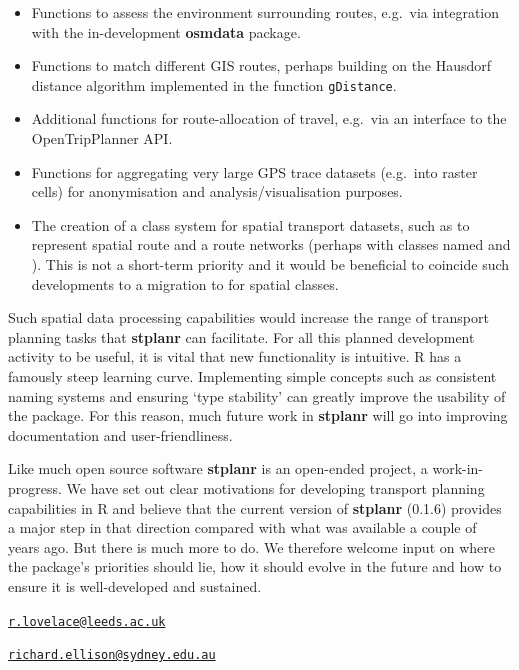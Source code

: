 \begin{itemize}
\tightlist
\item
  Functions to assess the environment surrounding routes, e.g.~via
  integration with the in-development \textbf{osmdata} package.
\item
  Functions to match different GIS routes, perhaps building on the
  Hausdorf distance algorithm implemented in the 
  function \texttt{gDistance}.
\item
  Additional functions for route-allocation of travel, e.g.~via an
  interface to the OpenTripPlanner API.
\item
  Functions for aggregating very large GPS trace datasets (e.g.~into
  raster cells) for anonymisation and analysis/visualisation purposes.
\item
  The creation of a class system for spatial transport datasets, such as
  to represent spatial route and a route networks (perhaps with classes
  named  and ). This is not a short-term priority
  and it would be beneficial to coincide such developments to a
  migration to  for spatial classes.
\end{itemize}

Such spatial data processing capabilities would increase the range of
transport planning tasks that \textbf{stplanr} can facilitate. For all
this planned development activity to be useful, it is vital that new
functionality is intuitive. R has a famously steep learning curve.
Implementing simple concepts such as consistent naming systems
\citep{baath_state_2012} and ensuring `type stability' can greatly
improve the usability of the package. For this reason, much future work
in \textbf{stplanr} will go into improving documentation and
user-friendliness.

Like much open source software \textbf{stplanr} is an open-ended
project, a work-in-progress. We have set out clear motivations for
developing transport planning capabilities in R and believe that the
current version of \textbf{stplanr} (0.1.6) provides a major step in
that direction compared with what was available a couple of years ago.
But there is much more to do. We therefore welcome input on where the
package's priorities should lie, how it should evolve in the future and
how to ensure it is well-developed and sustained.



\address{%
Robin Lovelace\\
University of Leeds\\
34-40 University Road\\ LS2 9JT, UK\\
}
\href{mailto:r.lovelace@leeds.ac.uk}{\nolinkurl{r.lovelace@leeds.ac.uk}}

\address{%
Richard Ellison\\
University of Sydney\\
378 Abercrombie Street\\ Darlington, NSW 2008, Australia\\
}
\href{mailto:richard.ellison@sydney.edu.au}{\nolinkurl{richard.ellison@sydney.edu.au}}

